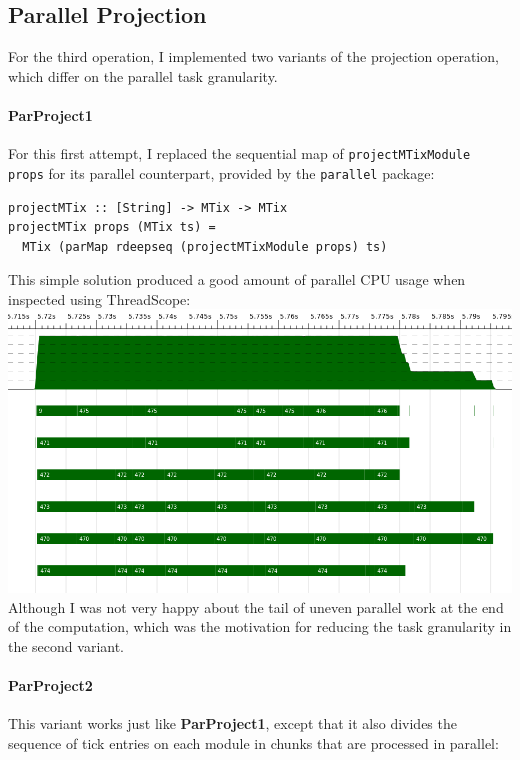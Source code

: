 \documentclass[a4paper,10pt]{article}
\begin{document}
\subsection*{Parallel Projection}

For the third operation, I implemented two variants of the projection operation,
which differ on the parallel task granularity.

\paragraph{ParProject1}

For this first attempt, I replaced the sequential map of
\texttt{projectMTixModule props} for its parallel counterpart, provided by the
\texttt{parallel} package:

\begin{verbatim}
projectMTix :: [String] -> MTix -> MTix
projectMTix props (MTix ts) =
  MTix (parMap rdeepseq (projectMTixModule props) ts)
\end{verbatim}

This simple solution produced a good amount of parallel CPU usage when inspected
using ThreadScope:\\

\includegraphics[scale=0.3]{threadscope/ParProject1}\\

Although I was not very happy about the tail of uneven parallel work at the end
of the computation, which was the motivation for reducing the task granularity
in the second variant.

\paragraph{ParProject2}

This variant works just like \textbf{ParProject1}, except that it also divides
the sequence of tick entries on each module in chunks that are processed in
parallel:
\end{document}
